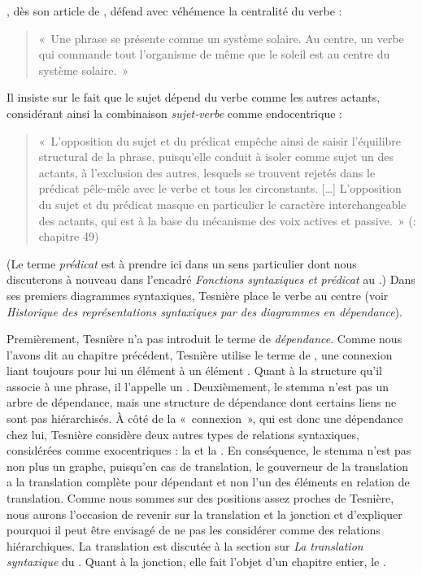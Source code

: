 {    , dès son article de \citeyear{tesniere1934comment}, défend avec véhémence la centralité du verbe : 
    \begin{quote}«~Une phrase se présente comme un système solaire. Au centre, un verbe qui commande tout l’organisme de même que le soleil est au centre du système solaire.~»\end{quote}
    Il insiste sur le fait que le sujet dépend du verbe comme les autres actants, considérant ainsi la combinaison \textit{sujet-verbe} comme endocentrique : 
    \begin{quote}«~L’opposition du sujet et du prédicat empêche ainsi de saisir l’équilibre structural de la phrase, puisqu’elle conduit à isoler comme sujet un des actants, à l’exclusion des autres, lesquels se trouvent rejetés dans le prédicat pêle-mêle avec le verbe et tous les circonstants. […] L’opposition du sujet et du prédicat masque en particulier le caractère interchangeable des actants, qui est à la base du mécanisme des voix actives et passive.~» (\citeyear{tesniere1959elements}: chapitre 49)\end{quote}
    (Le terme \textit{prédicat} est à prendre ici dans un sens particulier dont nous discuterons à nouveau dans l’encadré \textit{Fonctions syntaxiques et prédicat} au .) Dans ses premiers diagrammes syntaxiques, Tesnière place le verbe au centre (voir  \textit{Historique des représentations syntaxiques par des diagrammes en dépendance}).

    Premièrement, Tesnière n’a pas introduit le terme de \textit{dépendance}. Comme nous l’avons dit au chapitre précédent, Tesnière utilise le terme de {}, une connexion liant toujours pour lui un élément  à un élément . Quant à la structure qu’il associe à une phrase, il l’appelle un . Deuxièmement, le stemma n’est pas un arbre de dépendance, mais une structure de dépendance dont certains liens ne sont pas hiérarchisés. À côté de la «~connexion~», qui est donc une dépendance chez lui, Tesnière considère deux autres types de relations syntaxiques, considérées comme exocentriques : la  et la . En conséquence, le stemma n’est pas non plus un graphe, puisqu’en cas de translation, le gouverneur de la translation a la translation complète pour dépendant et non l’un des éléments en relation de translation. Comme nous sommes sur des positions assez proches de Tesnière, nous aurons l’occasion de revenir sur la translation et la jonction et d’expliquer pourquoi il peut être envisagé de ne pas les considérer comme des relations hiérarchiques. La translation est discutée à la section sur \textit{La translation syntaxique} du . Quant à la jonction, elle fait l’objet d’un chapitre entier, le .

}
